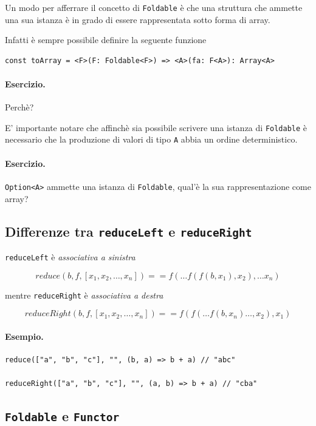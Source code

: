 \documentclass[12pt]{article}
\begin{document}
Un modo per afferrare il concetto di \texttt{Foldable} è che una struttura che ammette una sua istanza
è in grado di essere rappresentata sotto forma di array.

Infatti è sempre possibile definire la seguente funzione

\begin{verbatim}
const toArray = <F>(F: Foldable<F>) => <A>(fa: F<A>): Array<A>
\end{verbatim}

\paragraph{Esercizio.} Perchè?

E' importante notare che affinchè sia possibile scrivere una istanza di \texttt{Foldable} è necessario che la produzione di valori
di tipo \texttt{A} abbia un ordine deterministico.

\paragraph{Esercizio.} \texttt{Option<A>} ammette una istanza di \texttt{Foldable}, qual'è la sua rappresentazione come array?

\subsection{Differenze tra \texttt{reduceLeft} e \texttt{reduceRight}}

\texttt{reduceLeft} è \emph{associativa a sinistra}

$$
reduce(b, f, [x_1, x_2, \ldots , x_n])  == f( \ldots f(f(b, x_1), x_2), \ldots x_n)
$$

mentre \texttt{reduceRight} è \emph{associativa a destra}

$$
reduceRight(b, f, [x_1, x_2, \ldots , x_n])  == f(f( \ldots f(b, x_n) \ldots , x_2), x_1)
$$

\paragraph{Esempio.}

\begin{verbatim}
reduce(["a", "b", "c"], "", (b, a) => b + a) // "abc"

reduceRight(["a", "b", "c"], "", (a, b) => b + a) // "cba"
\end{verbatim}

\subsection{\texttt{Foldable} e \texttt{Functor}}
\end{document}

